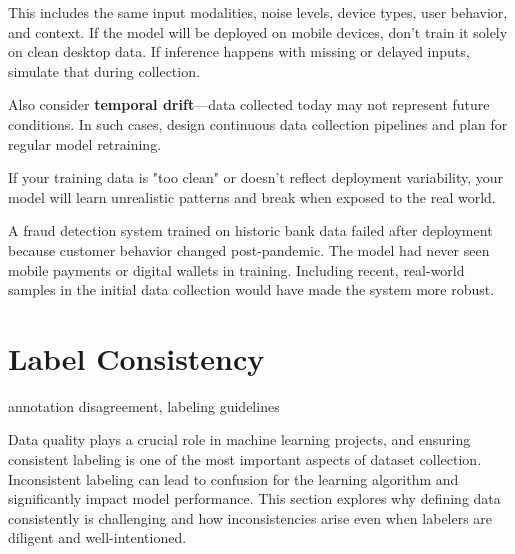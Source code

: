 \documentclass[12pt,openany]{book}
\begin{document}
This includes the same input modalities, noise levels, device types, user behavior, and context. If the model will be deployed on mobile devices, don’t train it solely on clean desktop data. If inference happens with missing or delayed inputs, simulate that during collection. \newline

Also consider \textbf{temporal drift}—data collected today may not represent future conditions. In such cases, design continuous data collection pipelines and plan for regular model retraining. \newline

If your training data is "too clean" or doesn't reflect deployment variability, your model will learn unrealistic patterns and break when exposed to the real world.

\begin{examplebox}
A fraud detection system trained on historic bank data failed after deployment because customer behavior changed post-pandemic. The model had never seen mobile payments or digital wallets in training. Including recent, real-world samples in the initial data collection would have made the system more robust.
\end{examplebox}



\section{Label Consistency}

\begin{keywordsbox}
annotation disagreement, labeling guidelines
\end{keywordsbox}

Data quality plays a crucial role in machine learning projects, and ensuring consistent labeling is one of the most important aspects of dataset collection. Inconsistent labeling can lead to confusion for the learning algorithm and significantly impact model performance. This section explores why defining data consistently is challenging and how inconsistencies arise even when labelers are diligent and well-intentioned. \newline
\end{document}
